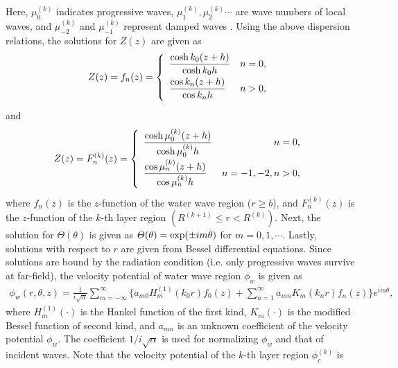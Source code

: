 \documentclass{jfm}
\begin{document}
Here, $\mu^{(k)}_0$ indicates progressive waves, $\mu^{(k)}_1,\mu^{(k)}_2\cdots$ are wave numbers of local waves, and $\mu^{(k)}_{-2}$ and $\mu^{(k)}_{-1}$ represent damped waves \cite[e.g.][]{Fox1994}. Using the above dispersion relations, the solutions for $Z(z)$ are given as
\begin{eqnarray}
Z(z)=f_n(z)=\left\{\begin{array}{lr}
\vspace{1mm}
\displaystyle \frac{\cosh{k_0(z+h)}}{\cosh k_0h}&n=0,\\
\vspace{1mm}
\displaystyle \frac{\cos{k_n(z+h)}}{\cos k_nh} &n> 0,\\
\end{array}\right.
\label{eq:04}
\end{eqnarray}
and
\begin{eqnarray}
Z(z)=F^{(k)}_n(z)=\left\{\begin{array}{lr}
\vspace{1mm}
\displaystyle \frac{\cosh{\mu^{(k)}_0(z+h)}}{\cosh\mu^{(k)}_0h}&n=0,\\
\vspace{1mm}
\displaystyle \frac{\cos{\mu^{(k)}_n(z+h)}}{\cos\mu^{(k)}_nh} &n=-1,-2,n> 0,
\end{array}\right.
\label{eq:05}
\end{eqnarray}
where $f_n(z)$ is the $z$-function of the water wave region ($r\ge b$), and $F^{(k)}_n(z)$ is the $z$-function of the $k$-th layer region $(R^{(k+1)}\le r < R^{(k)})$. 
Next, the solution for $\Theta(\theta)$ is given as $\Theta(\theta)={\rm exp}(\pm im\theta)$ for $m=0,1,\cdots$.
Lastly, solutions with respect to $r$ are given from Bessel differential equations. Since solutions are bound by the radiation condition (i.e. only progressive waves survive at far-field), the velocity potential of water wave region $\phi_w$ is given as
\begin{eqnarray}
\displaystyle \phi_{w}(r,\theta,z)=\frac{1}{i\sqrt{\alpha}}\sum_{m=-\infty}^{\infty}\bigg\{a_{m0}H_m^{(1)}(k_0r)f_0(z)+\sum_{n=1}^\infty a_{mn}K_m(k_nr)f_n(z)\bigg\}e^{im\theta},
\label{eq:06}
\end{eqnarray}
where $H_m^{(1)}(\cdot)$ is the Hankel function of the first kind, $K_m(\cdot)$ is the modified Bessel function of second kind, and $a_{mn}$ is an unknown coefficient of the velocity potential $\phi_w$. The coefficient $1/i\sqrt{\alpha}$ is used for normalizing $\phi_w$ and that of incident waves. Note that the velocity potential of the $k$-th layer region $\phi_c^{(k)}$ is 
\end{document}
